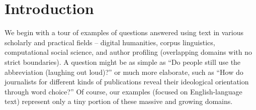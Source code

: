 

    
    
    



\section{Introduction}

We begin with a tour of examples of questions answered using text in
various scholarly and practical fields -- digital humanities, corpus
linguistics, computational social science, and author profiling
(overlapping domains with no strict boundaries). A question might be
as simple as ``Do people still use the abbreviation  (laughing out loud)?'' or much more elaborate, such as ``How do journalists for
different kinds of publications reveal their ideological orientation through word choice?''  Of
course, our examples (focused on English-language text) represent only
a tiny portion of these massive and growing domains.

